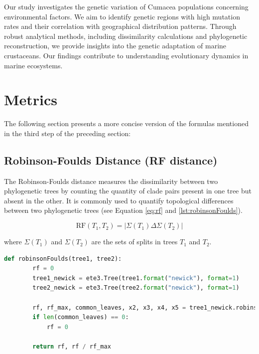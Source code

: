 Our study investigates the genetic variation of Cumacea populations concerning environmental factors. We aim to identify genetic regions with high mutation rates and their correlation with geographical distribution patterns. Through robust analytical methods, including dissimilarity calculations and phylogenetic reconstruction, we provide insights into the genetic adaptation of marine crustaceans. Our findings contribute to understanding evolutionary dynamics in marine ecosystems.

\section{Metrics}\label{metrics}
The following section presents a more concise version of the formulas mentioned in the third step of the preceding section:

\subsection{Robinson-Foulds Distance (RF distance)}\label{RF}
The Robinson-Foulds distance measures the dissimilarity between two phylogenetic trees by counting the quantity of clade pairs present in one tree but absent in the other. It is commonly used to quantify topological differences between two phylogenetic trees (see Equation \eqref{eq:rf} and \autoref{lst:robinsonFoulds}).

\begin{equation}\label{eq:rf}
    \text{RF}(T_1, T_2) = | \Sigma(T_1) \Delta \Sigma(T_2) |
\end{equation}

where $\Sigma(T_1)$ and $\Sigma(T_2)$ are the sets of splits in trees $T_1$ and $T_2$.

\begin{lstlisting}[label=lst:robinsonFoulds,language=Python,caption=Python script for calculating the Robinson-Foulds distance using the ete3 package in the \textit{aPhyloGeo} package]
    def robinsonFoulds(tree1, tree2):
        rf = 0
        tree1_newick = ete3.Tree(tree1.format("newick"), format=1)
        tree2_newick = ete3.Tree(tree2.format("newick"), format=1)

        rf, rf_max, common_leaves, x2, x3, x4, x5 = tree1_newick.robinson_foulds(tree2_newick, unrooted_trees=True)
        if len(common_leaves) == 0:
            rf = 0

        return rf, rf / rf_max
\end{lstlisting}


